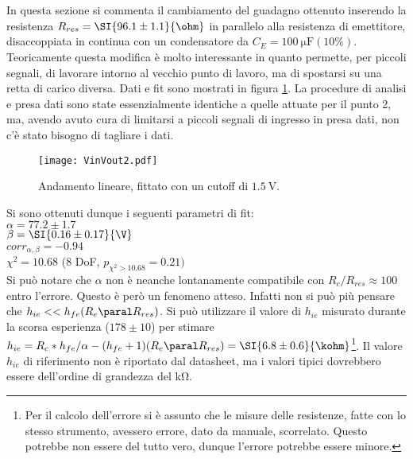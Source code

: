 \section{}
In questa sezione si commenta il cambiamento del guadagno ottenuto inserendo la resistenza $R_{res}=\SI{96.1\pm 1.1}{\ohm}$  in parallelo alla resistenza di emettitore, disaccoppiata in continua con un condensatore da $C_E=\SI{100}{\micro\farad} (10\%)$. Teoricamente questa modifica è molto interessante in quanto permette, per piccoli segnali, di lavorare intorno al vecchio punto di lavoro, ma di spostarsi su una retta di carico diversa. Dati e fit sono mostrati in figura \ref{f:VinVout2}. La procedure di analisi e presa dati sono state essenzialmente identiche a quelle attuate per il punto 2, ma, avendo avuto cura di limitarsi a piccoli segnali di ingresso in presa dati, non c'è stato bisogno di tagliare i dati.
\begin{figure}
\centering
	\texttt{[image: VinVout2.pdf]}
	\caption{Andamento lineare, fittato con un cutoff di $\SI{1.5}{\V}$.\label{f:VinVout2}}
\end{figure}

Si sono ottenuti dunque i seguenti parametri di fit:\\
$\alpha=77.2 \pm 1.7$\\
$\beta=\SI{0.16 \pm 0.17}{\V}$\\
$corr_{\alpha, \beta}=-0.94$\\
$\chi^2= 10.68$ ($8$ DoF, $p_{\chi^2>10.68} = 0.21)$\\

Si può notare che $\alpha$ non è neanche lontanamente compatibile con $R_c/R_{res}\approx 100$ entro l'errore. Questo è però un fenomeno atteso. Infatti non si può più pensare che $h_{ie}<<h_{fe}(R_e \paral R_{res})$. Si può utilizzare il valore di $h_{ie}$ misurato durante la scorsa esperienza ($178 \pm 10$) per stimare $h_{ie}=R_c*h_{fe}/\alpha-(h_{fe}+1)( R_e \paral R_{res} )=\SI{6.8\pm 0.6}{\kohm}$\footnote{Per il calcolo dell'errore si è assunto che le misure delle resistenze, fatte con lo stesso strumento, avessero errore, dato da manuale, scorrelato. Questo potrebbe non essere del tutto vero, dunque l'errore potrebbe essere minore.}. Il valore $h_{ie}$ di riferimento non è riportato dal datasheet, ma i valori tipici dovrebbero essere dell'ordine di grandezza del \si{\kohm}.

